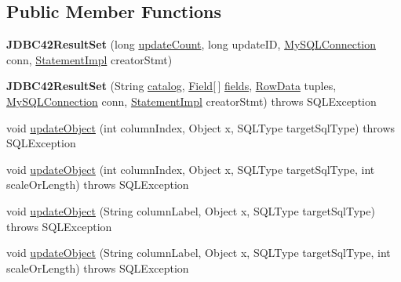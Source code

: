 \subsection*{Public Member Functions}
\begin{DoxyCompactItemize}
\item 
\mbox{\label{classcom_1_1mysql_1_1jdbc_1_1_j_d_b_c42_result_set_aaa25dc71c847bdfd22f2d4fe71702f43}} 
{\bfseries J\+D\+B\+C42\+Result\+Set} (long \mbox{\hyperlink{classcom_1_1mysql_1_1jdbc_1_1_result_set_impl_a3278756f102c97b9e4f5e5aa53590722}{update\+Count}}, long update\+ID, \mbox{\hyperlink{interfacecom_1_1mysql_1_1jdbc_1_1_my_s_q_l_connection}{My\+S\+Q\+L\+Connection}} conn, \mbox{\hyperlink{classcom_1_1mysql_1_1jdbc_1_1_statement_impl}{Statement\+Impl}} creator\+Stmt)
\item 
\mbox{\label{classcom_1_1mysql_1_1jdbc_1_1_j_d_b_c42_result_set_a11f50a0019ad8e70b51c29fad0cc1e70}} 
{\bfseries J\+D\+B\+C42\+Result\+Set} (String \mbox{\hyperlink{classcom_1_1mysql_1_1jdbc_1_1_result_set_impl_ae05d8a0ad69c96645b783537100fb95c}{catalog}}, \mbox{\hyperlink{classcom_1_1mysql_1_1jdbc_1_1_field}{Field}}\mbox{[}$\,$\mbox{]} \mbox{\hyperlink{classcom_1_1mysql_1_1jdbc_1_1_result_set_impl_a5da5c6ef8d035aa65884115a2f7daf67}{fields}}, \mbox{\hyperlink{interfacecom_1_1mysql_1_1jdbc_1_1_row_data}{Row\+Data}} tuples, \mbox{\hyperlink{interfacecom_1_1mysql_1_1jdbc_1_1_my_s_q_l_connection}{My\+S\+Q\+L\+Connection}} conn, \mbox{\hyperlink{classcom_1_1mysql_1_1jdbc_1_1_statement_impl}{Statement\+Impl}} creator\+Stmt)  throws S\+Q\+L\+Exception 
\item 
void \mbox{\hyperlink{classcom_1_1mysql_1_1jdbc_1_1_j_d_b_c42_result_set_a84eb48ea6bf52ea20f766f502c4d6590}{update\+Object}} (int column\+Index, Object x, S\+Q\+L\+Type target\+Sql\+Type)  throws S\+Q\+L\+Exception 
\item 
void \mbox{\hyperlink{classcom_1_1mysql_1_1jdbc_1_1_j_d_b_c42_result_set_a50677f0f41373c03476f245ddd5e9dcb}{update\+Object}} (int column\+Index, Object x, S\+Q\+L\+Type target\+Sql\+Type, int scale\+Or\+Length)  throws S\+Q\+L\+Exception 
\item 
void \mbox{\hyperlink{classcom_1_1mysql_1_1jdbc_1_1_j_d_b_c42_result_set_ada94c2a9be483d83de0000227f9d3509}{update\+Object}} (String column\+Label, Object x, S\+Q\+L\+Type target\+Sql\+Type)  throws S\+Q\+L\+Exception 
\item 
void \mbox{\hyperlink{classcom_1_1mysql_1_1jdbc_1_1_j_d_b_c42_result_set_a7c542e3fe6c79af807be636180f38844}{update\+Object}} (String column\+Label, Object x, S\+Q\+L\+Type target\+Sql\+Type, int scale\+Or\+Length)  throws S\+Q\+L\+Exception 
\end{DoxyCompactItemize}

